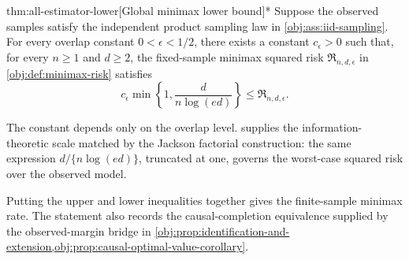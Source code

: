 \documentclass[11pt]{article}
\begin{document}
\begin{theoremv}{thm:all-estimator-lower}[Global minimax lower bound]*
Suppose the observed samples satisfy the independent product sampling law in \cref{obj:ass:iid-sampling}. For every overlap constant \(0<\epsilon<1/2\), there exists a constant \(c_\epsilon>0\) such that, for every \(n\geq 1\) and \(d\geq 2\), the fixed-sample minimax squared risk \(\mathfrak R_{n,d,\epsilon}\) in \cref{obj:def:minimax-risk} satisfies
\[
c_\epsilon \min\left\{1,\frac{d}{n\log(ed)}\right\}
\leq
\mathfrak R_{n,d,\epsilon}.
\]
\end{theoremv}

The constant  depends only on the overlap level.  supplies the information-theoretic scale matched by the Jackson factorial construction: the same expression \(d/\{n\log(ed)\}\), truncated at one, governs the worst-case squared risk over the observed model.

Putting the upper and lower inequalities together gives the finite-sample minimax rate. The statement also records the causal-completion equivalence supplied by the observed-margin bridge in \cref{obj:prop:identification-and-extension,obj:prop:causal-optimal-value-corollary}.
\end{document}
